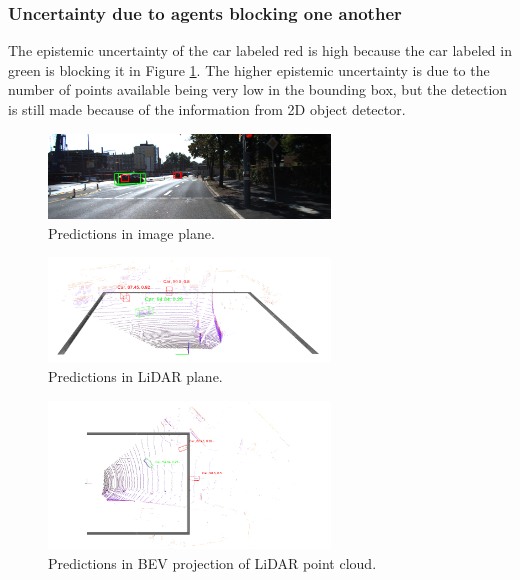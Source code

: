 \documentclass[10pt,twocolumn,letterpaper]{article}
\begin{document}
\subsubsection{Uncertainty due to agents blocking one another}
The epistemic uncertainty of the car labeled red is high because the car labeled in green is blocking it in Figure \ref{fig:Uncert_blockage-1_1}. The higher epistemic uncertainty is due to the number of points available being very low in the bounding box, but the detection is still made because of the information from 2D object detector.
\begin{figure}[!htbp]
        \centering
		\includegraphics[width=75mm, scale = 0.4]{images/Uncertainty_results/3461_overlap_bbox.png}
        \caption[Extracted frustum point cloud after Normalization]{Predictions in image plane.}
        \label{fig:Uncert_blockage-1_1}
\end{figure}
\begin{figure}[!htbp]
        \centering
		\includegraphics[width=75mm, scale = 0.4]{images/Uncertainty_results/3461_Follow_cam_view.png}
        \caption[Extracted frustum point cloud after Normalization]{Predictions in LiDAR plane.}
        \label{fig:Uncert_blockage-1_2}
\end{figure}
\begin{figure}[!htbp]
        \centering
		\includegraphics[width=75mm,scale = 0.4]{images/Uncertainty_results/3461_overlap.png}
        \caption[Extracted frustum point cloud after Normalization]{Predictions in BEV projection of LiDAR point cloud.}
        \label{fig:Uncert_blockage-1_3}
\end{figure}
\end{document}

